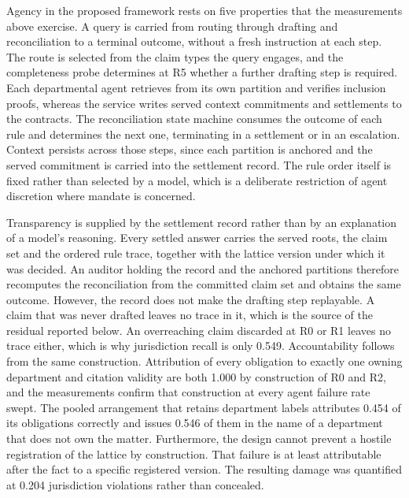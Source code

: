 \documentclass[journal]{IEEEtran}
\begin{document}
Agency in the proposed framework rests on five properties that the measurements above exercise. A query is carried from routing through drafting and reconciliation to a terminal outcome, without a fresh instruction at each step. The route is selected from the claim types the query engages, and the completeness probe determines at R5 whether a further drafting step is required. Each departmental agent retrieves from its own partition and verifies inclusion proofs, whereas the service writes served context commitments and settlements to the contracts. The reconciliation state machine consumes the outcome of each rule and determines the next one, terminating in a settlement or in an escalation. Context persists across those steps, since each partition is anchored and the served commitment is carried into the settlement record. The rule order itself is fixed rather than selected by a model, which is a deliberate restriction of agent discretion where mandate is concerned.

Transparency is supplied by the settlement record rather than by an explanation of a model's reasoning. Every settled answer carries the served roots, the claim set and the ordered rule trace, together with the lattice version under which it was decided. An auditor holding the record and the anchored partitions therefore recomputes the reconciliation from the committed claim set and obtains the same outcome. However, the record does not make the drafting step replayable. A claim that was never drafted leaves no trace in it, which is the source of the residual reported below. An overreaching claim discarded at R0 or R1 leaves no trace either, which is why jurisdiction recall is only 0.549. Accountability follows from the same construction. Attribution of every obligation to exactly one owning department and citation validity are both 1.000 by construction of R0 and R2, and the measurements confirm that construction at every agent failure rate swept. The pooled arrangement that retains department labels attributes 0.454 of its obligations correctly and issues 0.546 of them in the name of a department that does not own the matter. Furthermore, the design cannot prevent a hostile registration of the lattice by construction. That failure is at least attributable after the fact to a specific registered version. The resulting damage was quantified at 0.204 jurisdiction violations rather than concealed.
\end{document}
